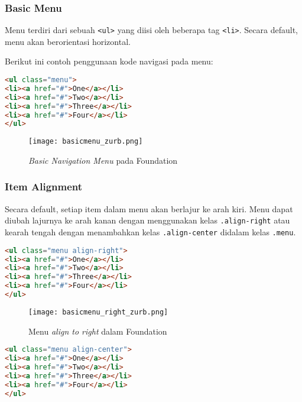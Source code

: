 \subsubsection{Basic Menu}

Menu terdiri dari sebuah \texttt{<ul>} yang diisi oleh beberapa tag \texttt{<li>}. Secara default, menu akan berorientasi horizontal.

Berikut ini contoh penggunaan kode navigasi pada menu:

\begin{lstlisting}[language=HTML,  basicstyle=\ttfamily, frame=single, columns=fullflexible, keepspaces=true, breaklines=true, showstringspaces=false, label={lst:basicFoundation}, caption=Basic Menu Foundation 6.] 
<ul class="menu">
<li><a href="#">One</a></li>
<li><a href="#">Two</a></li>
<li><a href="#">Three</a></li>
<li><a href="#">Four</a></li>
</ul>
\end{lstlisting}

\begin{figure} [H]  
	\centering  
	\texttt{[image: basicmenu\_zurb.png]}  
	\caption{\textit{Basic Navigation Menu} pada Foundation}
	\label{fig:navFoundation}
\end{figure}

\subsubsection{Item Alignment}
Secara default, setiap item dalam menu akan berlajur ke arah kiri. Menu dapat diubah lajurnya ke arah kanan dengan menggunakan kelas \texttt{.align-right} atau kearah tengah dengan menambahkan kelas \texttt{.align-center} didalam kelas \texttt{.menu}.
\begin{lstlisting}[language=HTML,  basicstyle=\ttfamily, frame=single, columns=fullflexible, keepspaces=true, breaklines=true, showstringspaces=false, label={lst:itemAlignmentFoundation}, caption=Item Alignment Foundation 6.] 
<ul class="menu align-right">
<li><a href="#">One</a></li>
<li><a href="#">Two</a></li>
<li><a href="#">Three</a></li>
<li><a href="#">Four</a></li>
</ul>
\end{lstlisting}

\begin{figure}[H]
	\centering  
	\texttt{[image: basicmenu\_right\_zurb.png]}  
	\caption{Menu \textit{align to right} dalam Foundation}
	\label{fig:alignRightFoundation}
\end{figure}

\begin{lstlisting}[language=HTML,  basicstyle=\ttfamily, frame=single, columns=fullflexible, keepspaces=true, breaklines=true, showstringspaces=false, label={lst:aligntorightFoundation}, caption=Align to right Foundation 6.] 
<ul class="menu align-center">
<li><a href="#">One</a></li>
<li><a href="#">Two</a></li>
<li><a href="#">Three</a></li>
<li><a href="#">Four</a></li>
</ul>
\end{lstlisting}

